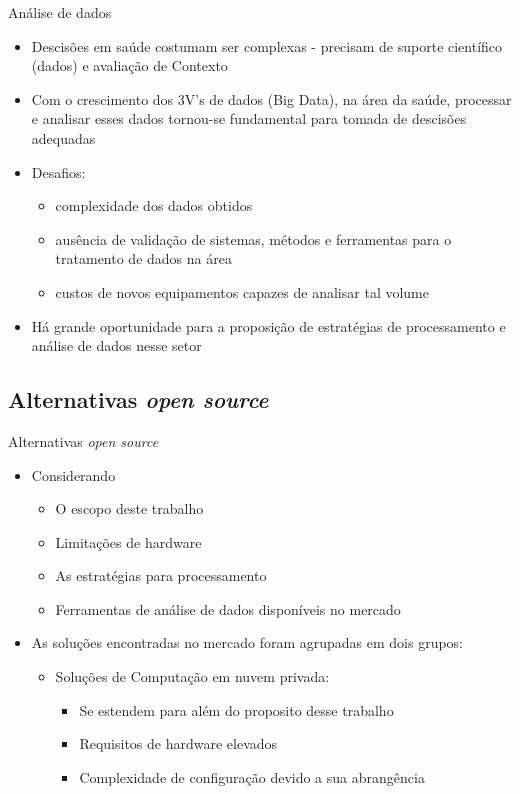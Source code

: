 \documentclass[10pt,brazil]{beamer}
\theoremstyle{definition}
\begin{document}
\begin{frame}{Análise de dados}
  \begin{itemize}
    \item Descisões em saúde costumam ser complexas - precisam de suporte científico (dados) e avaliação de Contexto
    \item Com o crescimento dos 3V's de dados (Big Data), na área da saúde, processar e analisar esses dados tornou-se fundamental para tomada de descisões adequadas
    \item Desafios:
      \begin{itemize}
        \item complexidade dos dados obtidos
        \item ausência de validação de sistemas, métodos e ferramentas para o tratamento de dados na área
        \item custos de novos equipamentos capazes de analisar tal volume
      \end{itemize}
    \item Há grande oportunidade para a proposição de estratégias de processamento e análise de dados nesse setor
  \end{itemize}
\end{frame}

\subsection{Alternativas \emph{open source}}

\begin{frame}{Alternativas \emph{open source}}
  \begin{itemize}
    \item Considerando
          \begin{itemize}
            \item O escopo deste trabalho
            \item Limitações de hardware
            \item As estratégias para processamento
            \item Ferramentas de análise de dados disponíveis no mercado
          \end{itemize}
    \item [] As soluções encontradas no mercado foram agrupadas em dois grupos:
          \begin{itemize}
            \item Soluções de Computação em nuvem privada:
                  \begin{itemize}
                    \item Se estendem para além do proposito desse trabalho
                    \item Requisitos de hardware elevados
                    \item Complexidade de configuração devido a sua abrangência
                  \end{itemize}
          \end{itemize}
  \end{itemize}
\end{frame}
\end{document}
